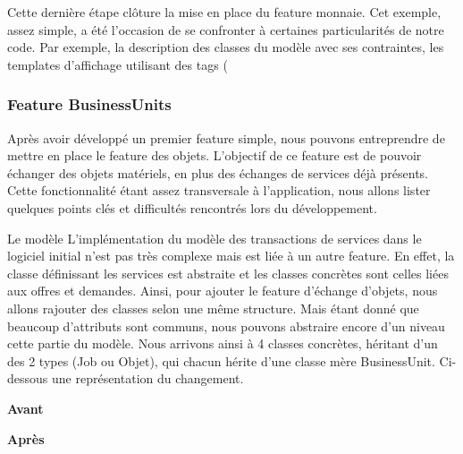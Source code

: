 Cette dernière étape clôture la mise en place du feature monnaie.  Cet exemple,  assez simple,  a été l'occasion de se confronter à certaines particularités de notre code.  Par exemple,  la description des classes du modèle avec ses contraintes,  les templates d'affichage utilisant des tags ( {%

\subsubsection{Feature BusinessUnits}

Après avoir développé un premier feature simple,  nous pouvons entreprendre de mettre en place le feature des objets.  L'objectif de ce feature est de pouvoir échanger des objets matériels,  en plus des échanges de services déjà présents.  Cette fonctionnalité étant assez transversale à l'application,  nous allons lister quelques points clés et difficultés rencontrés lors du développement.  

\begin{description}
\item{Le modèle}
L'implémentation du modèle des transactions de services dans le logiciel initial n'est pas très complexe mais est liée à un autre feature.  En effet,  la classe définissant les services est abstraite et les classes concrètes sont celles liées aux offres et demandes.  Ainsi,  pour ajouter le feature d'échange  d'objets,  nous allons rajouter des classes selon une même structure.  Mais étant donné que beaucoup d'attributs sont communs,  nous pouvons abstraire encore d'un niveau cette partie du modèle.  Nous arrivons ainsi à 4 classes concrètes,  héritant d'un des 2 types (Job ou Objet),  qui chacun hérite d'une classe mère BusinessUnit.  Ci-dessous une représentation du changement.


\vspace{0.3cm}
\begin{minipage}{.5\textwidth}
\begin{center} \textbf{Avant}

\end{center}
\end{minipage}
\hspace{0.3cm}
\begin{minipage}{.5\textwidth}
\begin{center} \textbf{Après}\end{center}


\end{minipage}
\end{description}}
